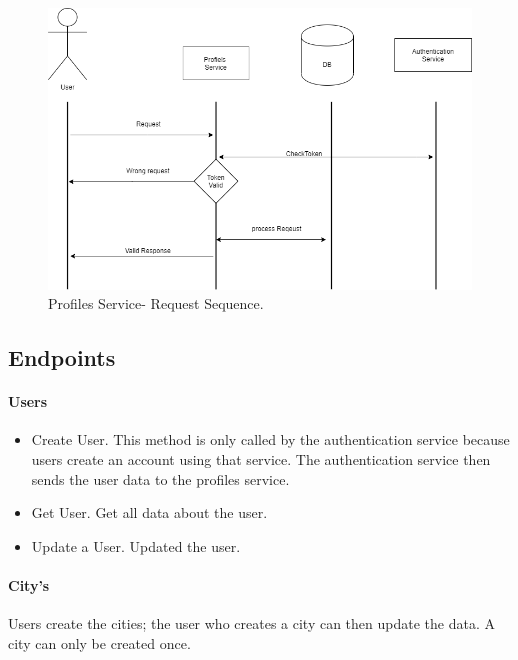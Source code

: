 \begin{figure}
	\begin{center}
		\includegraphics[width=120mm,scale=1]{img/profiles/profile-request-sequence.png}
		\caption{Profiles Service- Request Sequence.}
		\label{profiles:reqeustsequence}
	\end{center}
\end{figure}

\subsection{Endpoints}

\paragraph{Users}

\begin{itemize}
	\item Create User. This method is only called by the authentication service because users create an account using that service. The authentication service then sends the user data to the profiles service.
	
	\item	Get User. Get all data about the user.
	
	\item	Update a User. Updated the user.
\end{itemize}


\paragraph{City's}


\indent
Users create the cities; the user who creates a city can then update the data. A city can only be created once.



